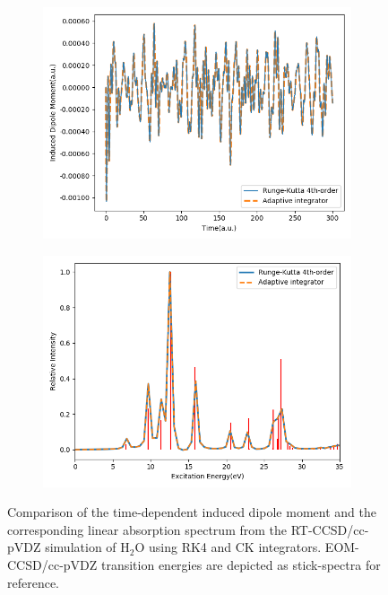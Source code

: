 \begin{figure}
    \centering
    \begin{subfigure}{0.475\textwidth}
        \centering
        \includegraphics[width=\textwidth]{ch3/Figs/3-1.png}
    \end{subfigure}
    \hfill
    \begin{subfigure}{0.475\textwidth}
        \centering
        \includegraphics[width=\textwidth]{ch3/Figs/3-2.png}
    \end{subfigure}
    \caption{Comparison of the time-dependent induced dipole moment and the
corresponding linear absorption spectrum from the RT-CCSD/cc-pVDZ simulation of
H$_2$O using RK4 and CK integrators. EOM-CCSD/cc-pVDZ transition energies are
depicted as stick-spectra for reference.}
    \label{fig:ck-results}
\end{figure}

